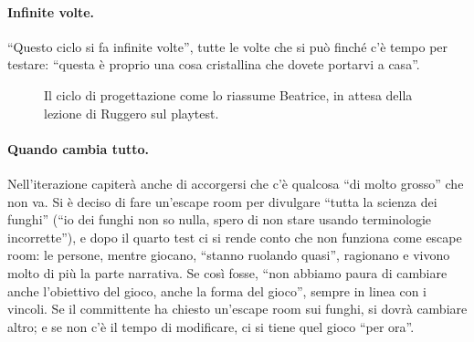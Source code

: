 \paragraph{Infinite volte.} ``Questo ciclo si fa infinite volte'', tutte le volte che
si può finché c'è tempo per testare: ``questa è proprio una cosa cristallina che
dovete portarvi a casa''.

\begin{figure}[htbp]
\centering
{}
\caption{Il ciclo di progettazione come lo riassume Beatrice, in attesa della lezione
di Ruggero sul playtest.}
\label{a9:fig:ciclo}
\end{figure}

\paragraph{Quando cambia tutto.} Nell'iterazione capiterà anche di accorgersi che c'è
qualcosa ``di molto grosso'' che non va. Si è deciso di fare un'escape room per
divulgare ``tutta la scienza dei funghi'' (``io dei funghi non so nulla, spero di non
stare usando terminologie incorrette''), e dopo il quarto test ci si rende conto che
non funziona come escape room: le persone, mentre giocano, ``stanno ruolando quasi'',
ragionano e vivono molto di più la parte narrativa. Se così fosse, ``non abbiamo
paura di cambiare anche l'obiettivo del gioco, anche la forma del gioco'', sempre in
linea con i vincoli. Se il committente ha chiesto un'escape room sui funghi, si dovrà
cambiare altro; e se non c'è il tempo di modificare, ci si tiene quel gioco ``per
ora''.

